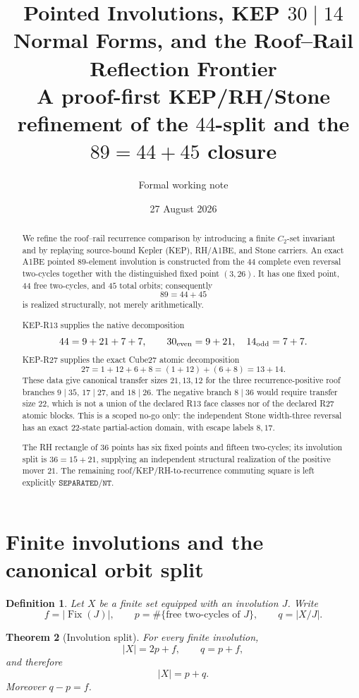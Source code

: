 \documentclass[11pt,a4paper]{article}
\title{\textbf{Pointed Involutions, KEP \(30\mid14\) Normal Forms, and the Roof--Rail Reflection Frontier}\\
\large A proof-first KEP/RH/Stone refinement of the \(44\)-split and the \(89=44+45\) closure}
\author{Formal working note}
\date{27 August 2026}
\newtheorem{definition}{Definition}[section]
\newtheorem{theorem}[definition]{Theorem}
\newcommand{\SEP}{\texttt{SEPARATED}}
\newcommand{\NT}{\texttt{NT}}
\begin{document}
\maketitle

\begin{abstract}
We refine the roof--rail recurrence comparison by introducing a finite
\(C_2\)-set invariant and by replaying source-bound Kepler (KEP), RH/A1BE,
and Stone carriers.  An exact A1BE pointed \(89\)-element involution is
constructed from the \(44\) complete even reversal two-cycles together
with the distinguished fixed point \((3,26)\).  It has one fixed point,
\(44\) free two-cycles, and \(45\) total orbits; consequently
\[
89=44+45
\]
is realized structurally, not merely arithmetically.

KEP-R13 supplies the native decomposition
\[
44=9+21+7+7,\qquad 30_{\rm even}=9+21,\quad14_{\rm odd}=7+7.
\]
KEP-R27 supplies the exact Cube27 atomic decomposition
\[
27=1+12+6+8=(1+12)+(6+8)=13+14.
\]
These data give canonical transfer sizes \(21,13,12\) for the three
recurrence-positive roof branches \(9\mid35\), \(17\mid27\), and
\(18\mid26\).  The negative branch \(8\mid36\) would require transfer
size \(22\), which is not a union of the declared R13 face classes nor
of the declared R27 atomic blocks.  This is a scoped no-go only:
the independent Stone width-three reversal has an exact \(22\)-state
partial-action domain, with escape labels \(8,17\).

The RH rectangle of \(36\) points has six fixed points and fifteen
two-cycles; its involution split is \(36=15+21\), supplying an independent
structural realization of the positive mover \(21\).  The remaining
roof/KEP/RH-to-recurrence commuting square is left explicitly
\(\SEP/\NT\).
\end{abstract}

\section{Finite involutions and the canonical orbit split}

\begin{definition}
Let \(X\) be a finite set equipped with an involution \(J\).
Write
\[
f=|\operatorname{Fix}(J)|,\qquad
p=\#\{\text{free two-cycles of }J\},
\qquad
q=|X/J|.
\]
\end{definition}

\begin{theorem}[Involution split]
For every finite involution,
\[
|X|=2p+f,\qquad q=p+f,
\]
and therefore
\[
\boxed{|X|=p+q.}
\]
Moreover \(q-p=f\).
\end{theorem}
\end{document}
